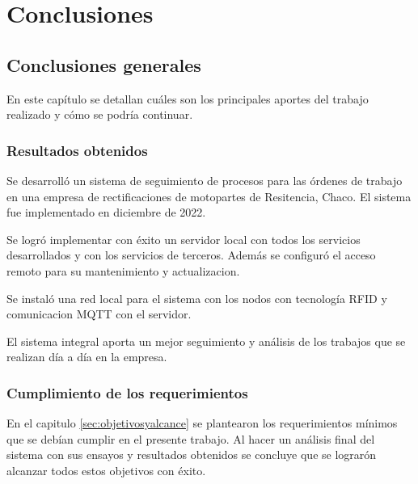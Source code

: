 
\chapter{Conclusiones} %

\label{Chapter5} %




\section{Conclusiones generales }

En este capítulo se detallan cuáles son los principales aportes del trabajo realizado y cómo se podría continuar. 

\subsection{Resultados obtenidos}

Se desarrolló un sistema de seguimiento de procesos para las órdenes de trabajo en una empresa de rectificaciones de motopartes de Resitencia, Chaco. El sistema fue implementado en diciembre de 2022. 

Se logró implementar con éxito un servidor local con todos los servicios desarrollados y con los servicios de terceros. Además se configuró el acceso remoto para su mantenimiento y actualizacion.

Se instaló una red local para el sistema con los nodos con tecnología RFID y comunicacion MQTT con el servidor.

El sistema integral aporta un mejor seguimiento y análisis de los trabajos que se realizan día a día en la empresa.

\subsection{Cumplimiento de los requerimientos}

En el capitulo \ref{sec:objetivosyalcance} se plantearon los requerimientos mínimos que se debían cumplir en el presente trabajo. Al hacer un análisis final del sistema con sus ensayos y resultados obtenidos se concluye que se lograrón alcanzar todos estos objetivos con éxito. 

